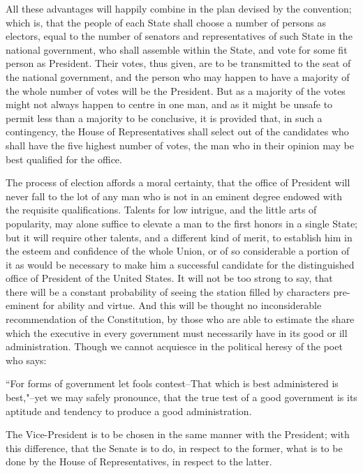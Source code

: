 All these advantages will happily combine in the plan devised by the convention; which is, that the people of each State shall choose a number of persons as electors, equal to the number of senators and representatives of such State in the national government, who shall assemble within the State, and vote for some fit person as President. Their votes, thus given, are to be transmitted to the seat of the national government, and the person who may happen to have a majority of the whole number of votes will be the President. But as a majority of the votes might not always happen to centre in one man, and as it might be unsafe to permit less than a majority to be conclusive, it is provided that, in such a contingency, the House of Representatives shall select out of the candidates who shall have the five highest number of votes, the man who in their opinion may be best qualified for the office.

The process of election affords a moral certainty, that the office of President will never fall to the lot of any man who is not in an eminent degree endowed with the requisite qualifications. Talents for low intrigue, and the little arts of popularity, may alone suffice to elevate a man to the first honors in a single State; but it will require other talents, and a different kind of merit, to establish him in the esteem and confidence of the whole Union, or of so considerable a portion of it as would be necessary to make him a successful candidate for the distinguished office of President of the United States. It will not be too strong to say, that there will be a constant probability of seeing the station filled by characters pre-eminent for ability and virtue. And this will be thought no inconsiderable recommendation of the Constitution, by those who are able to estimate the share which the executive in every government must necessarily have in its good or ill administration. Though we cannot acquiesce in the political heresy of the poet who says:

``For forms of government let fools contest--That which is best administered is best,"--yet we may safely pronounce, that the true test of a good government is its aptitude and tendency to produce a good administration.

The Vice-President is to be chosen in the same manner with the President; with this difference, that the Senate is to do, in respect to the former, what is to be done by the House of Representatives, in respect to the latter.

